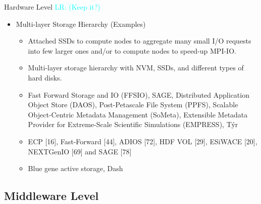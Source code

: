 \documentclass[compress,11pt,xcolor=svgnames,aspectratio=169]{beamer}
\newcommand{\lr}[1]{\textcolor{cyan}{LR: #1}}
\begin{document}
\begin{frame}[fragile]{Hardware Level \lr{(Keep it?)}}

\begin{itemize}

      \item Multi-layer Storage Hierarchy (Examples)\\[0.4cm]

        \begin{itemize}
        \setlength\itemsep{0.6cm}

        \item Attached SSDs to compute nodes to aggregate many small I/O requests into few larger ones and/or to compute nodes to speed-up MPI-IO.

        \item Multi-layer storage hierarchy with NVM, SSDs, and different types of hard disks. %

        \item Fast Forward Storage and IO (FFSIO), SAGE, Distributed Application Object Store (DAOS), Post-Petascale File System (PPFS), Scalable Object-Centric Metadata Management (SoMeta), Extensible Metadata Provider for Extreme-Scale Scientific Simulations (EMPRESS), Týr

        \item ECP [16], Fast-Forward [44], ADIOS [72], HDF VOL [29], ESiWACE [20], NEXTGenIO [69] and SAGE [78]

        \item Blue gene active storage, Dash

        \end{itemize}

\end{itemize}

\nocite{3372390}

\end{frame}

\subsection{Middleware Level}
\end{document}

